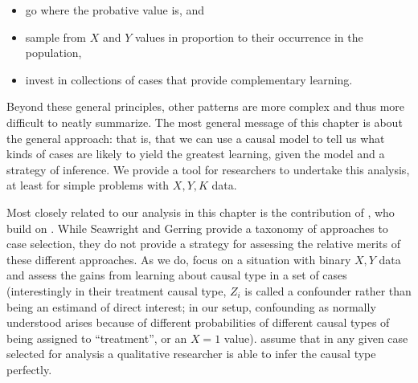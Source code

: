 \documentclass[
  12pt,
]{book}
\providecommand{\tightlist}{%
  \setlength{\itemsep}{0pt}\setlength{\parskip}{0pt}}
\begin{document}
\begin{itemize}
\tightlist
\item
  go where the probative value is, and
\item
  sample from \(X\) and \(Y\) values in proportion to their occurrence in the population,
\item
  invest in collections of cases that provide complementary learning.
\end{itemize}

Beyond these general principles, other patterns are more complex and thus more difficult to neatly summarize. The most general message of this chapter is about the general approach: that is, that we can use a causal model to tell us what kinds of cases are likely to yield the greatest learning, given the model and a strategy of inference. We provide a tool for researchers to undertake this analysis, at least for simple problems with \(X, Y, K\) data.

Most closely related to our analysis in this chapter is the contribution of \citet{HerronQuinn}, who build on \citet{SeawrightGerring2008}. While Seawright and Gerring provide a taxonomy of approaches to case selection, they do not provide a strategy for assessing the relative merits of these different approaches. As we do, \citet{HerronQuinn} focus on a situation with binary \(X,Y\) data and assess the gains from learning about causal type in a set of cases (interestingly in their treatment causal type, \(Z_i\) is called a confounder rather than being an estimand of direct interest; in our setup, confounding as normally understood arises because of different probabilities of different causal types of being assigned to ``treatment'', or an \(X=1\) value). \citet{HerronQuinn} assume that in any given case selected for analysis a qualitative researcher is able to infer the causal type perfectly.
\end{document}
